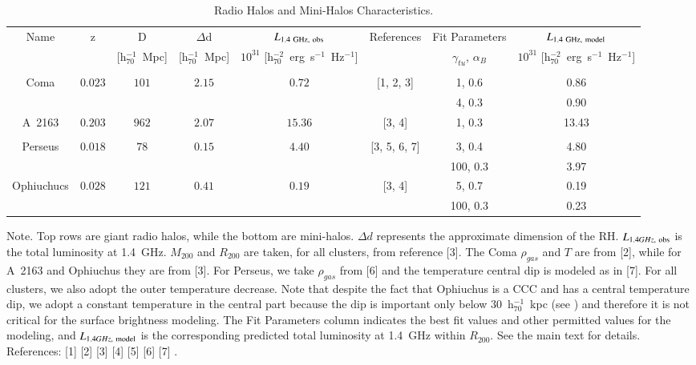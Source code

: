 \documentclass[traditabstract]{aa}
\begin{document}
\begin{table}[hbt!]
\begin{center}
\caption{Radio Halos and Mini-Halos Characteristics.}
\medskip
\begin{tabular}{cccccccc}
\hline
\phantom{\Big|}
Name & z & D & $\Delta$d & $L_{1.4~\rm{GHz},~\rm{obs}}$ & References & Fit Parameters & $L_{1.4~\rm{GHz},~\rm{model}}$ \\
\phantom{\Big|}
           &   & [h$_{70}^{-1}$~Mpc] & [h$_{70}^{-1}$~Mpc] & $10^{31}$ [h$_{70}^{-2}$~erg~s$^{-1}$~Hz$^{-1}$] & & $\gamma_{tu}$, $\alpha_B$ & $10^{31}$ [h$_{70}^{-2}$~erg~s$^{-1}$~Hz$^{-1}$] \\
\hline \\[-0.5em]
Coma           & $0.023$ & $101$ & $2.15$ & $0.72$  &  [1, 2, 3]    & 1, 0.6  & 0.86   \\
               &         &       &        &         &               & 4, 0.3  & 0.90   \\
A~2163         & $0.203$ & $962$ & $2.07$ & $15.36$ &  [3, 4]       & 1, 0.3  & 13.43  \\
\hline \\[-0.5em]
Perseus        & $0.018$ & $78$   & $0.15$ & $4.40$ &  [3, 5, 6, 7] & 3, 0.4   & 4.80  \\
               &         &        &        &        &               & 100, 0.3 & 3.97  \\
Ophiuchucs     & $0.028$ & $121$  & $0.41$ & $0.19$ &  [3, 4]       & 5, 0.7   & 0.19  \\
               &         &        &        &        &               & 100, 0.3 & 0.23  \\[0.5em]
\hline
\end{tabular}
\label{tab:RadioHalos}
\end{center}
\footnotesize{Note. Top rows are giant radio halos, while the bottom are mini-halos. $\Delta d$ represents the approximate dimension of the RH. $L_{1.4 GHz,~\rm{obs}}$ is the total luminosity at 1.4~GHz. $M_{200}$ and $R_{200}$ are taken, for all clusters, from reference [3]. The Coma $\rho_{gas}$ and $T$ are from [2], while for A~2163 and Ophiuchus they are from [3]. For Perseus, we take $\rho_{gas}$ from [6] and the temperature central dip is modeled as in [7]. For all clusters, we also adopt the outer temperature decrease. Note that despite the fact that Ophiuchus is a CCC and has a central temperature dip, we adopt a constant temperature in the central part because the dip is important only below $30$~h$_{70}^{-1}$~kpc (see \citealp{2010MNRAS.405.1624M}) and therefore it is not critical for the surface brightness modeling. The Fit Parameters column indicates the best fit values and other permitted values for the modeling, and $L_{1.4 GHz,~\rm{model}}$ is the corresponding predicted total luminosity at 1.4~GHz within $R_{200}$. See the main text for details. References: [1] \cite{1997A&A...321...55D} [2] \cite{1992A&A...259L..31B} [3] \cite{2002ApJ...567..716R} [4] \cite{2009A&A...499..679M} [5] \cite{1990MNRAS.246..477P} [6] \cite{2003ApJ...590..225C} [7] \cite{2004A&A...413...17P}.}
\end{table}
\end{document}
